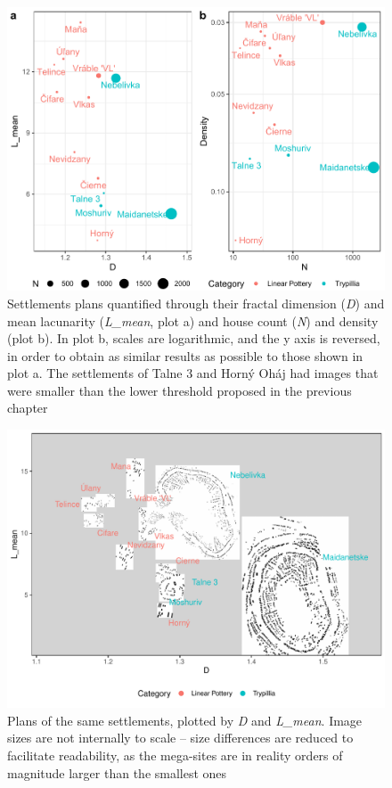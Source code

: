 \documentclass[
  12pt,
]{book}
\begin{document}
\begin{figure}

{\centering \includegraphics[width=0.9\linewidth]{bookdown-demo_files/figure-latex/09-settle-points-1} 

}

\caption{Settlements plans quantified through their fractal dimension (\emph{D}) and mean lacunarity (\emph{L\_mean}, plot a) and house count (\emph{N}) and density (plot b). In plot b, scales are logarithmic, and the y axis is reversed, in order to obtain as similar results as possible to those shown in plot a. The settlements of Talne 3 and Horný Oháj had images that were smaller than the lower threshold proposed in the previous chapter}\label{fig:09-settle-points}
\end{figure}

\begin{figure}
\hypertarget{fig:09-settlements}{%
\centering
\includegraphics{Results/fig09_settlements.pdf}
\caption{Plans of the same settlements, plotted by \emph{D} and \emph{L\_mean}. Image sizes are not internally to scale -- size differences are reduced to facilitate readability, as the mega-sites are in reality orders of magnitude larger than the smallest ones}\label{fig:09-settlements}
}
\end{figure}
\end{document}
